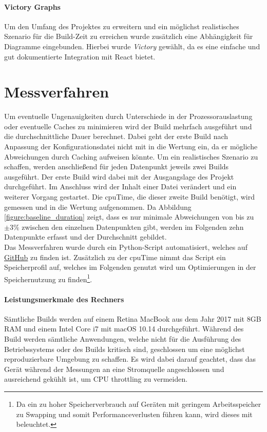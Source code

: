 \documentclass[11pt]{report}
\begin{document}
			\paragraph{Victory Graphs} Um den Umfang des Projektes zu erweitern und ein möglichst realistisches Szenario für die Build-Zeit zu erreichen wurde zusätzlich eine Abhängigkeit für Diagramme eingebunden. Hierbei wurde \emph{Victory}\cite{frameworks:victory} gewählt, da es eine einfache und gut dokumentierte Integration mit React bietet.

		\section{Messverfahren}
			Um eventuelle Ungenauigkeiten durch Unterschiede in der Prozessorauslastung oder eventuelle Caches zu minimieren wird der Build mehrfach ausgeführt und die durchschnittliche Dauer berechnet. Dabei geht der erste Build nach Anpassung der Konfigurationsdatei nicht mit in die Wertung ein, da er mögliche Abweichungen durch Caching aufweisen könnte. Um ein realistisches Szenario zu schaffen, werden anschließend für jeden Datenpunkt jeweils zwei Builds ausgeführt. Der erste Build wird dabei mit der Ausgangslage des Projekt durchgeführt. Im Anschluss wird der Inhalt einer Datei verändert und ein weiterer Vorgang gestartet. Die \Gls{cpuTime}, die dieser zweite Build benötigt, wird gemessen und in die Wertung aufgenommen. Da Abbildung \ref{figure:baseline_duration} zeigt, dass es nur minimale Abweichungen von bis zu $\pm 3\%$ zwischen den einzelnen Datenpunkten gibt, werden im Folgenden zehn Datenpunkte erfasst und der Durchschnitt gebildet.\\
			Das Messverfahren wurde durch ein Python-Script automatisiert, welches auf \href{https://github.com/TexNAK/WebBundlerOptimization/blob/40c8c00dee7af6970bc82c29e2fc0f3cfd6c12eb/webpack-project/runBuilds.py}{GitHub} zu finden ist. Zusätzlich zu der \Gls{cpuTime} nimmt das Script ein Speicherprofil auf, welches im Folgenden genutzt wird um Optimierungen in der Speichernutzung zu finden\footnote{Da ein zu hoher Speicherverbrauch auf Geräten mit geringem Arbeitsspeicher zu Swapping und somit Performanceverlusten führen kann, wird dieses mit beleuchtet.}.
			\paragraph{Leistungsmerkmale des Rechners} Sämtliche Builds werden auf einem Retina MacBook aus dem Jahr 2017 mit 8GB RAM und einem Intel Core i7 mit macOS 10.14 durchgeführt. Während des Build werden sämtliche Anwendungen, welche nicht für die Ausführung des Betriebssystems oder des Builds kritisch sind, geschlossen um eine möglichst reproduzierbare Umgebung zu schaffen. Es wird dabei darauf geachtet, dass das Gerät während der Messungen an eine Stromquelle angeschlossen und ausreichend gekühlt ist, um CPU throttling zu vermeiden.
\end{document}
